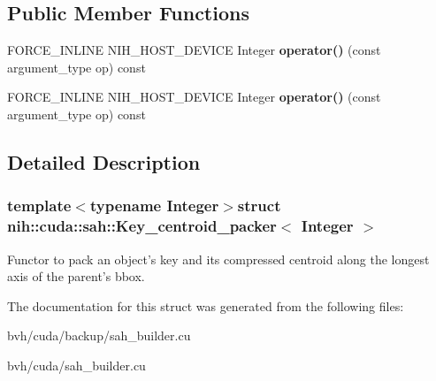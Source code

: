 \subsection*{\-Public \-Member \-Functions}
\begin{DoxyCompactItemize}
\item 
\hypertarget{structnih_1_1cuda_1_1sah_1_1_key__centroid__packer_a18ed3fc9ce51a51c91820d0f6140efd7}{
\-F\-O\-R\-C\-E\-\_\-\-I\-N\-L\-I\-N\-E \-N\-I\-H\-\_\-\-H\-O\-S\-T\-\_\-\-D\-E\-V\-I\-C\-E \*
\-Integer {\bfseries operator()} (const argument\-\_\-type op) const }
\label{structnih_1_1cuda_1_1sah_1_1_key__centroid__packer_a18ed3fc9ce51a51c91820d0f6140efd7}

\item 
\hypertarget{structnih_1_1cuda_1_1sah_1_1_key__centroid__packer_a18ed3fc9ce51a51c91820d0f6140efd7}{
\-F\-O\-R\-C\-E\-\_\-\-I\-N\-L\-I\-N\-E \-N\-I\-H\-\_\-\-H\-O\-S\-T\-\_\-\-D\-E\-V\-I\-C\-E \*
\-Integer {\bfseries operator()} (const argument\-\_\-type op) const }
\label{structnih_1_1cuda_1_1sah_1_1_key__centroid__packer_a18ed3fc9ce51a51c91820d0f6140efd7}

\end{DoxyCompactItemize}


\subsection{\-Detailed \-Description}
\subsubsection*{template$<$typename Integer$>$struct nih\-::cuda\-::sah\-::\-Key\-\_\-centroid\-\_\-packer$<$ Integer $>$}

\-Functor to pack an object's key and its compressed centroid along the longest axis of the parent's bbox. 

\-The documentation for this struct was generated from the following files\-:\begin{DoxyCompactItemize}
\item 
bvh/cuda/backup/sah\-\_\-builder.\-cu\item 
bvh/cuda/sah\-\_\-builder.\-cu\end{DoxyCompactItemize}

